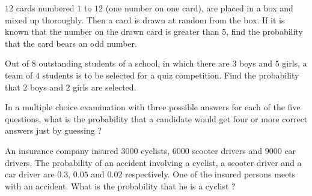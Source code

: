   \item $12$ cards numbered $1$ to $12$ (one number on one card), are placed in a box and mixed up thoroughly. Then a card is drawn at random from the box. If it is known that the number on the drawn card is greater than $5$, find the probability that the card bears an odd number.

    \item Out of $8$ outstanding students of a school, in which there are $3$ boys and $5$ girls, a team of $4$ students is to be selected for a quiz competition. Find the probability that $2$ boys and $2$ girls are selected.

    \item In a multiple choice examination with three possible answers for each of the five questions, what is the probability that a candidate would get four or more correct answers just by guessing ?

    \item An insurance company insured $3000$ cyclists,  $6000$ scooter drivers and $9000$ car drivers. The probability of an accident involving a cyclist, a scooter driver and a car driver are $0.3$, $0.05$ and $0.02$ respectively. One of the insured persons meets with an accident. What is the probability that he is a cyclist ?
   
